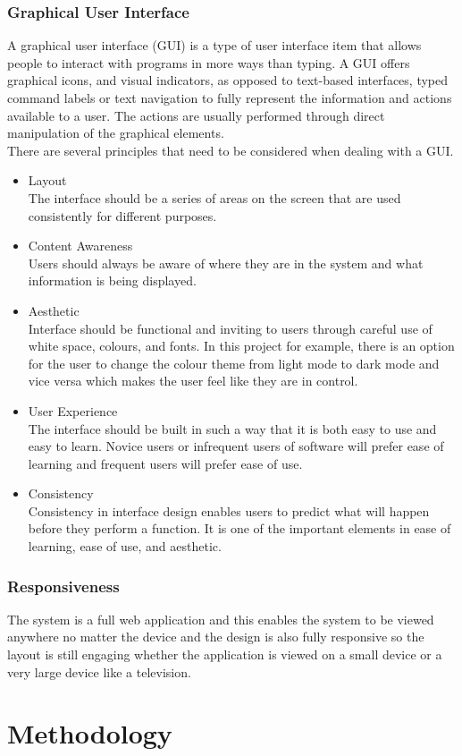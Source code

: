 \documentclass[twoside, a4paper, 12pt]{report}
\begin{document}
\subsection{Graphical User Interface}
A graphical user interface (GUI) is a type of user interface item that allows people to interact with programs in more ways than typing. A GUI offers graphical icons, and visual indicators, as opposed to text-based interfaces, typed command labels or text navigation to fully represent the information and actions available to a user. The actions are usually performed through direct manipulation of the graphical elements.\\
\indent
There are several principles that need to be considered when dealing with a GUI.
\begin{itemize}
\item Layout\\
The interface should be a series of areas on the screen that are used consistently for different purposes.
\item Content Awareness\\
Users should always be aware of where they are in the system and what information is being displayed.
\item Aesthetic\\
Interface should be functional and inviting to users through careful use of white space, colours, and fonts. In this project for example, there is an option for the user to change the colour theme from light mode to dark mode and vice versa which makes the user feel like they are in control.
\item User Experience\\
The interface should be built in such a way that it is both easy to use and easy to learn. Novice users or infrequent users of software will prefer ease of learning and frequent users will prefer ease of use.
\item Consistency\\
Consistency in interface design enables users to predict what will happen before they perform a function. It is one of the important elements in ease of learning, ease of use, and aesthetic.
\end{itemize}

\subsection{Responsiveness}
The system is a full web application and this enables the system to be viewed anywhere no matter the device and the design is also fully responsive so the layout is still engaging whether the application is viewed on a small device or a very large device like a television. 

\chapter{Methodology}



\end{document}
